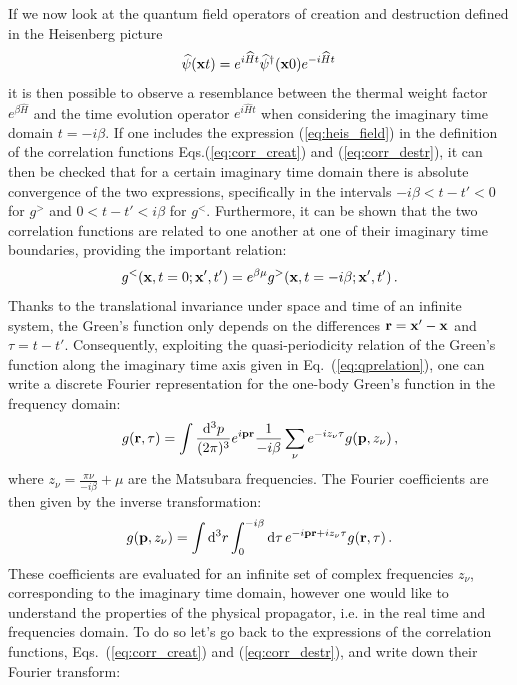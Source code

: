 If we now look at the quantum field operators of creation and destruction defined in the Heisenberg picture
\begin{equation}
\label{eq:heis_field}
\widehat\psi({\bf x}t)=e^{i\widehat Ht}\widehat\psi^\dagger({\bf x}0)e^{-i\widehat Ht}\,
\end{equation}
it is then possible to observe a resemblance between the thermal weight factor $e^{\beta\widehat H}$ and the time evolution operator $e^{i\widehat Ht}$ when considering the imaginary time domain $t=-i\beta$. If one includes the expression (\ref{eq:heis_field}) in the definition of the correlation functions Eqs.(\ref{eq:corr_creat}) and (\ref{eq:corr_destr}), it can then be checked that for a certain imaginary time domain there is absolute convergence of the two expressions, specifically in the intervals $-i\beta<t-t'<0$ for $g^>$ and $0<t-t'<i\beta$ for $g^<$. Furthermore, it can be shown that the two correlation functions are related to one another at one of their imaginary time boundaries, providing the important relation: 
\begin{equation}
\label{eq:qprelation}
g^<({\bf x},t=0;{\bf x'}, t')=e^{\beta\mu}g^>({\bf x},t=-i\beta;{\bf x'},t')\,.
\end{equation}
Thanks to the translational invariance under space and time of an infinite system, the Green's function only depends on the differences ${\bf r}={\bf x'}-{\bf x}$ and $\tau=t-t'$. Consequently, exploiting the quasi-periodicity relation of the Green's function along the imaginary time axis given in Eq.~(\ref{eq:qprelation}), one can write a discrete Fourier representation for the one-body Green's function in the frequency domain:
\begin{equation}
g({\bf r},\tau)=\int \frac{{\rm d}^3p}{(2\pi)^3}e^{i{\bf p}{\bf r}}\frac{1}{-i\beta}\sum_\nu e^{-iz_\nu\tau}g({\bf p},z_\nu)\,,
\end{equation}
where $z_\nu=\frac{\pi\nu}{-i\beta}+\mu$ are the Matsubara frequencies. The Fourier coefficients are then given by the inverse transformation:
\begin{equation}
\label{eq:Fouriercoeff}
g({\bf p},z_\nu)=\int {\rm d}^3r\int_0^{-i\beta}{\rm d}\tau\,e^{-i{\bf p}{\bf r}+iz_\nu\tau}g({\bf r},\tau)\,.
\end{equation}
These coefficients are evaluated for an infinite set of complex frequencies $z_\nu$, corresponding to the imaginary time domain, however one would like to understand the properties of the physical propagator, i.e. in the real time and frequencies domain. To do so let's go back to the expressions of the correlation functions, Eqs.~(\ref{eq:corr_creat}) and (\ref{eq:corr_destr}), and write down their Fourier transform:
